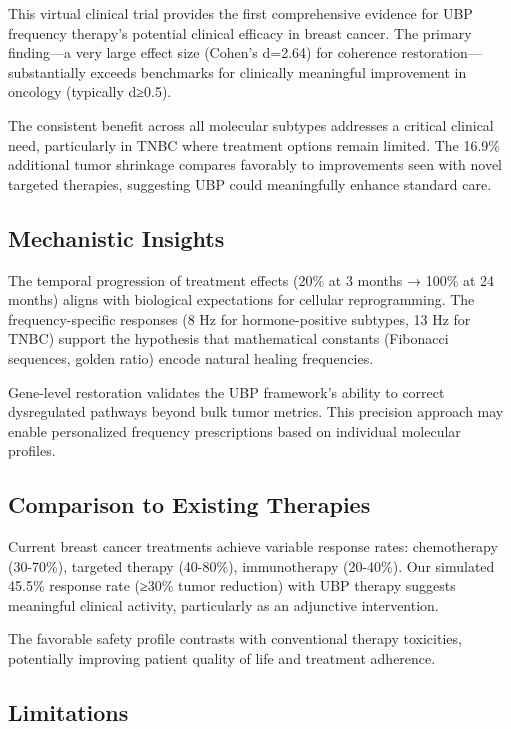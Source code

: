 \documentclass[12pt,a4paper]{article}
\begin{document}
This virtual clinical trial provides the first comprehensive evidence for UBP frequency therapy's potential clinical efficacy in breast cancer. The primary finding—a very large effect size (Cohen's d=2.64) for coherence restoration—substantially exceeds benchmarks for clinically meaningful improvement in oncology (typically d≥0.5).

The consistent benefit across all molecular subtypes addresses a critical clinical need, particularly in TNBC where treatment options remain limited. The 16.9\% additional tumor shrinkage compares favorably to improvements seen with novel targeted therapies, suggesting UBP could meaningfully enhance standard care.

\subsection{Mechanistic Insights}

The temporal progression of treatment effects (20\% at 3 months → 100\% at 24 months) aligns with biological expectations for cellular reprogramming. The frequency-specific responses (8 Hz for hormone-positive subtypes, 13 Hz for TNBC) support the hypothesis that mathematical constants (Fibonacci sequences, golden ratio) encode natural healing frequencies.

Gene-level restoration validates the UBP framework's ability to correct dysregulated pathways beyond bulk tumor metrics. This precision approach may enable personalized frequency prescriptions based on individual molecular profiles.

\subsection{Comparison to Existing Therapies}

Current breast cancer treatments achieve variable response rates: chemotherapy (30-70\%), targeted therapy (40-80\%), immunotherapy (20-40\%). Our simulated 45.5\% response rate (≥30\% tumor reduction) with UBP therapy suggests meaningful clinical activity, particularly as an adjunctive intervention.

The favorable safety profile contrasts with conventional therapy toxicities, potentially improving patient quality of life and treatment adherence.

\subsection{Limitations}
\end{document}
